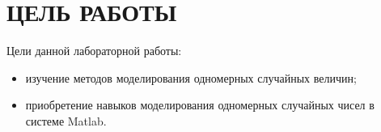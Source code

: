 \section{ЦЕЛЬ РАБОТЫ}

Цели данной лабораторной работы:

\begin{itemize}

\item
  изучение методов моделирования одномерных случайных величин;
\item
  приобретение навыков моделирования одномерных случайных чисел в системе Matlab.

\end{itemize}
